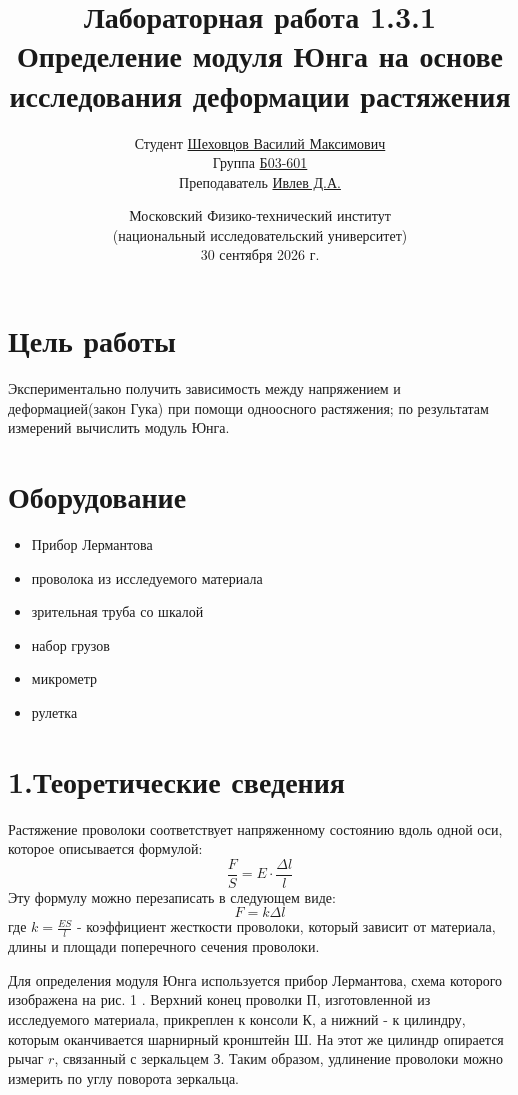 \documentclass[12pt,a4paper]{article}
\title{\textbf{Лабораторная работа 1.3.1}\\
Определение модуля Юнга на основе исследования деформации растяжения}
\author{
    Студент \underline{Шеховцов Василий Максимович}\\
    Группа \underline{Б03-601}\\
    Преподаватель \underline{Ивлев Д.А.}
}
\date{
Московский Физико-технический институт\\
(национальный исследовательский университет)\\
30 сентября 2026 г.
}
\begin{document}

\maketitle

\section*{Цель работы}
Экспериментально получить зависимость между напряжением и деформацией(закон Гука) при помощи
одноосного растяжения; по результатам измерений вычислить модуль Юнга.

\section*{Оборудование}
\begin{itemize}
    \item Прибор Лермантова
    \item проволока из исследуемого материала
    \item зрительная труба со шкалой
    \item набор грузов
    \item микрометр
    \item рулетка
\end{itemize}

\section*{1.Теоретические сведения}
Растяжение проволоки соответствует напряженному состоянию вдоль одной оси, которое описывается формулой:
\begin{equation}
    \frac{F}{S} = E \cdot \frac{\Delta l}{l}
\end{equation}
Эту формулу можно перезаписать в следующем виде:
\begin{equation}
    F = k \Delta l
\end{equation}
где $k = \frac{ES}{l}$ - коэффициент жесткости проволоки, который зависит от материала, длины и площади поперечного сечения проволоки.

Для определения модуля Юнга используется прибор Лермантова, схема которого изображена на рис. 1
. Верхний конец проволки П, изготовленной из исследуемого материала, прикреплен к консоли К, а нижний - 
к цилиндру, которым оканчивается шарнирный кронштейн Ш. На этот же цилиндр опирается рычаг $r$, связанный с зеркальцем З. Таким образом,
удлинение проволоки можно измерить по углу поворота зеркальца.
\end{document}
